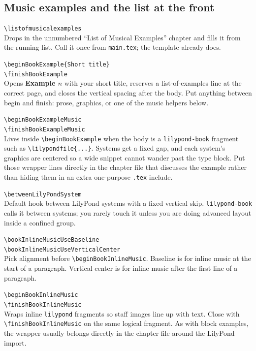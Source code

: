 \subsection*{Music examples and the list at the front}
\begingroup
\sloppy

\noindent\texttt{\textbackslash listofmusicalexamples}\\
Drops in the unnumbered ``List of Musical Examples'' chapter and fills it from the running list. Call it once from \verb|main.tex|; the template already does.

\noindent\texttt{\textbackslash beginBookExample\{Short title\}}\\
\texttt{\textbackslash finishBookExample}\\
Opens \textbf{Example $n$} with your short title, reserves a list-of-examples line at the correct page, and closes the vertical spacing after the body. Put anything between begin and finish: prose, graphics, or one of the music helpers below.

\noindent\texttt{\textbackslash beginBookExampleMusic}\\
\texttt{\textbackslash finishBookExampleMusic}\\
Lives inside \verb|\beginBookExample| when the body is a \verb|lilypond-book| fragment such as \verb|\lilypondfile{...}|. Systems get a fixed gap, and each system's graphics are centered so a wide snippet cannot wander past the type block. Put those wrapper lines directly in the chapter file that discusses the example rather than hiding them in an extra one-purpose \texttt{.tex} include.

\noindent\texttt{\textbackslash betweenLilyPondSystem}\\
Default hook between LilyPond systems with a fixed vertical skip. \verb|lilypond-book| calls it between systems; you rarely touch it unless you are doing advanced layout inside a confined group.

\noindent\texttt{\textbackslash bookInlineMusicUseBaseline}\\
\texttt{\textbackslash bookInlineMusicUseVerticalCenter}\\
Pick alignment before \verb|\beginBookInlineMusic|. Baseline is for inline music at the start of a paragraph. Vertical center is for inline music after the first line of a paragraph.

\noindent\texttt{\textbackslash beginBookInlineMusic}\\
\texttt{\textbackslash finishBookInlineMusic}\\
Wraps inline \verb|lilypond| fragments so staff images line up with text. Close with \verb|\finishBookInlineMusic| on the same logical fragment. As with block examples, the wrapper usually belongs directly in the chapter file around the LilyPond import.


